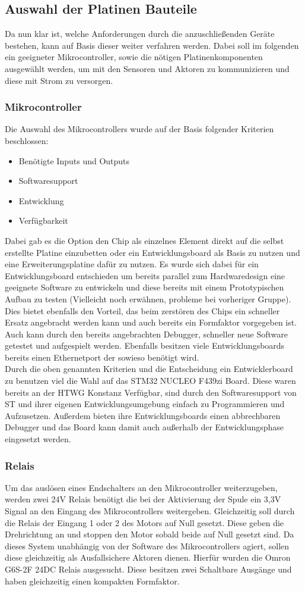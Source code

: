 \subsection{Auswahl der Platinen Bauteile}
Da nun klar ist, welche Anforderungen durch die anzuschließenden Geräte bestehen, kann auf Basis dieser weiter verfahren werden. Dabei soll im folgenden ein geeigneter Mikrocontroller, sowie die nötigen Platinenkomponenten ausgewählt werden, um mit den Sensoren und Aktoren zu kommunizieren und diese mit Strom zu versorgen.
\subsubsection{Mikrocontroller}
Die Auswahl des Mikrocontrollers wurde auf der Basis folgender Kriterien beschlossen:
\begin{itemize}
	\item Benötigte Inputs und Outputs
	\item Softwaresupport 
	\item Entwicklung
	\item Verfügbarkeit
\end{itemize}
Dabei gab es die Option den Chip als einzelnes Element direkt auf die selbst erstellte Platine einzubetten oder ein Entwicklungsboard als Basis zu nutzen und eine Erweiterungsplatine dafür zu nutzen. Es wurde sich dabei für ein Entwicklungsboard entschieden um bereits parallel zum Hardwaredesign eine geeignete Software zu entwickeln und diese bereits mit einem Prototypischen Aufbau zu testen (Vielleicht noch erwähnen, probleme bei vorheriger Gruppe). Dies bietet ebenfalls den Vorteil, das beim zerstören des Chips ein schneller Ersatz angebracht werden kann und auch bereits ein Formfaktor vorgegeben ist. Auch kann durch den bereits angebrachten Debugger, schneller neue Software getestet und aufgespielt werden. Ebenfalls besitzen viele Entwicklungsboards bereits einen Ethernetport der sowieso benötigt wird.\\

\noindent Durch die oben genannten Kriterien und die Entscheidung ein Entwicklerboard zu benutzen viel die Wahl auf das STM32 NUCLEO F439zi Board. Diese waren bereits an der HTWG Konstanz Verfügbar, sind durch den Softwaresupport von ST und ihrer eigenen Entwicklungsumgebung einfach zu Programmieren und Aufzusetzen. Außerdem bieten ihre Entwicklungsboards einen abbrechbaren Debugger und das Board kann damit auch außerhalb der Entwicklungsphase eingesetzt werden.
\subsubsection{Relais}
Um das auslösen eines Endschalters an den Mikrocontroller weiterzugeben, werden zwei 24V Relais benötigt die bei der Aktivierung der Spule ein 3,3V Signal an den Eingang des Mikrocontrollers weitergeben. Gleichzeitig soll durch die Relais der Eingang 1 oder 2 des Motors auf Null gesetzt. Diese geben die Drehrichtung an und stoppen den Motor sobald beide auf Null gesetzt sind. Da dieses System unabhängig von der Software des Mikrocontrollers agiert, sollen diese gleichzeitig als Ausfallsichere Aktoren dienen. Hierfür wurden die Omron G6S-2F 24DC Relais ausgesucht. Diese besitzen zwei Schaltbare Ausgänge und haben gleichzeitig einen kompakten Formfaktor.
